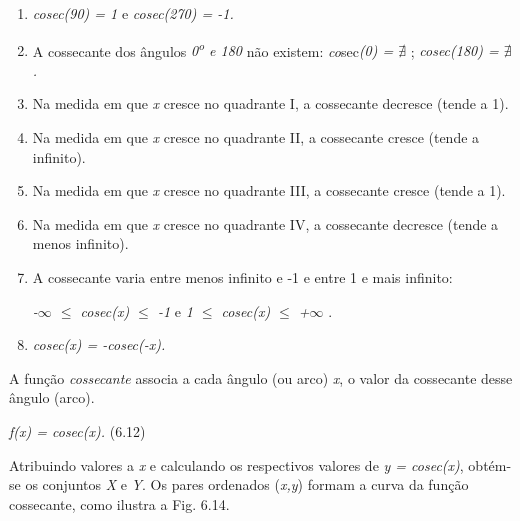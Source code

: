 \begin{caixa}
\begin{enumerate}
    \item \textit{cosec(90\degree) = 1}   e  \textit{cosec(270\degree) = -1.}

    \item A cossecante dos ângulos \textit{0\textsuperscript{o} e 180\degree} não existem: \textit{co}sec\textit{(0\degree) =  \(  \nexists  \) };  \textit{cosec(180\degree) =  \(  \nexists  \) .}

    \item Na medida em que \textit{x} cresce no quadrante I, a cossecante decresce (tende a 1).

    \item Na medida em que \textit{x} cresce no quadrante II, a cossecante cresce (tende a infinito).

    \item Na medida em que \textit{x} cresce no quadrante III, a cossecante cresce (tende a 1).

    \item Na medida em que \textit{x} cresce no quadrante IV, a cossecante decresce (tende a menos infinito).

    \item A cossecante varia entre menos infinito e -1 e entre 1 e mais infinito: 

 \textit{-$\infty$  $ \leq $  cosec(x) $ \leq $  -1  }e\textit{   1 $ \leq $  cosec(x) $ \leq $  +$\infty$     }.

    \item \textit{ cosec(x) = -cosec(-x).}
\end{enumerate}
\end{caixa}

\begin{caixa}
A função \textit{cossecante} associa a cada ângulo (ou arco) \textit{x}, o valor da cossecante desse ângulo (arco).

\textit{f(x) = cosec(x).} \tab (6.12)
\end{caixa}

Atribuindo valores a \textit{x} e calculando os respectivos valores de \textit{y = cosec(x)}, obtém-se os conjuntos \textit{X }e\textit{ Y}. Os pares ordenados (\textit{x,y}) formam a curva da função cossecante, como ilustra a Fig. 6.14.

